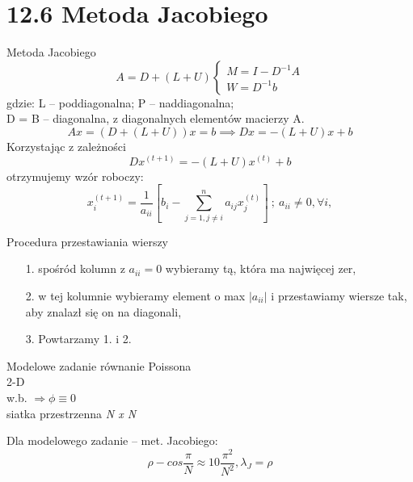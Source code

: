 \section{12.6 Metoda Jacobiego}

\begin{frame}{Metoda Jacobiego}
  $$
  A=D+(L+U)
  \begin{cases}
  M=I-D^{-1}A\\
  W=D^{-1}b
  \end{cases}
  $$
  gdzie: L -- poddiagonalna; P -- naddiagonalna;\\
  D = B -- diagonalna, z diagonalnych elementów macierzy A.
  $$Ax = (D+(L+U))x = b \implies Dx = -(L+U)x + b$$
  Korzystając z zależności
  $$\boxed{Dx^{(t+1)}= -(L+U)x^{(t)}+b}$$
  otrzymujemy wzór roboczy:
  $$x_i^{(t+1)}=\frac{1}{a_{ii}}[b_i-\sum_{j=1,j\neq i}^{n} a_{ij}x_j^{(t)}]\  ;\  a_{ii} \neq 0, \forall i,$$
\end{frame}

\begin{frame}
  \begin{block}{Procedura przestawiania wierszy}
    \begin{itemize}
      \item[1.] spośród kolumn z $a_{ii} = 0$ wybieramy tą, która ma najwięcej zer,
      \item[2.] w tej kolumnie wybieramy element o max $|a_{ii}|$ i przestawiamy wiersze tak, aby znalazł się on na diagonali,
      \item[3.] Powtarzamy 1. i 2.
    \end{itemize}
  \end{block}
\end{frame}

\begin{frame}{}
  \begin{block}{Modelowe zadanie}
    równanie Poissona
    \\2-D
    \\w.b. $\Rightarrow\phi\equiv 0$
    \\siatka przestrzenna \emph{N x N}
  \end{block}

  \begin{block}{Dla modelowego zadanie -- met. Jacobiego:}
    $$\rho - cos\frac{\pi}{N}\approx 1 0 \frac{\pi^2}{N^2}, \lambda _J = \rho$$
  \end{block}
\end{frame}

